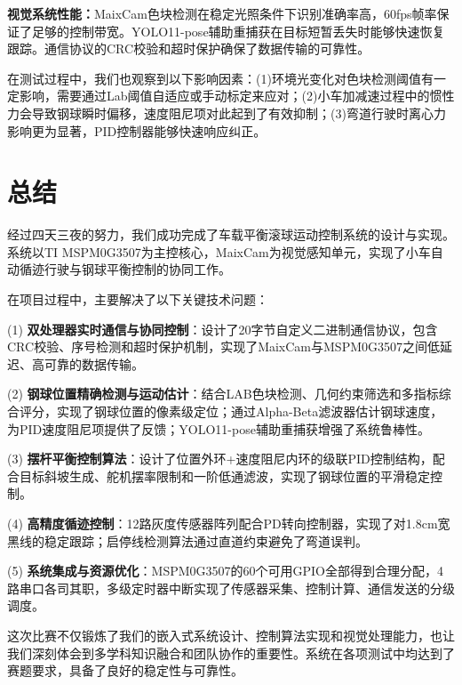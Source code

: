 \documentclass[12pt,a4paper]{ctexart}
\begin{document}
\textbf{视觉系统性能：}MaixCam色块检测在稳定光照条件下识别准确率高，60fps帧率保证了足够的控制带宽。YOLO11-pose辅助重捕获在目标短暂丢失时能够快速恢复跟踪。通信协议的CRC校验和超时保护确保了数据传输的可靠性。

在测试过程中，我们也观察到以下影响因素：(1)环境光变化对色块检测阈值有一定影响，需要通过Lab阈值自适应或手动标定来应对；(2)小车加减速过程中的惯性力会导致钢球瞬时偏移，速度阻尼项对此起到了有效抑制；(3)弯道行驶时离心力影响更为显著，PID控制器能够快速响应纠正。

\section{\textbf{总结}}

经过四天三夜的努力，我们成功完成了车载平衡滚球运动控制系统的设计与实现。系统以TI MSPM0G3507为主控核心，MaixCam为视觉感知单元，实现了小车自动循迹行驶与钢球平衡控制的协同工作。

在项目过程中，主要解决了以下关键技术问题：

(1) \textbf{双处理器实时通信与协同控制}：设计了20字节自定义二进制通信协议，包含CRC校验、序号检测和超时保护机制，实现了MaixCam与MSPM0G3507之间低延迟、高可靠的数据传输。

(2) \textbf{钢球位置精确检测与运动估计}：结合LAB色块检测、几何约束筛选和多指标综合评分，实现了钢球位置的像素级定位；通过Alpha-Beta滤波器估计钢球速度，为PID速度阻尼项提供了反馈；YOLO11-pose辅助重捕获增强了系统鲁棒性。

(3) \textbf{摆杆平衡控制算法}：设计了位置外环+速度阻尼内环的级联PID控制结构，配合目标斜坡生成、舵机摆率限制和一阶低通滤波，实现了钢球位置的平滑稳定控制。

(4) \textbf{高精度循迹控制}：12路灰度传感器阵列配合PD转向控制器，实现了对1.8cm宽黑线的稳定跟踪；启停线检测算法通过直道约束避免了弯道误判。

(5) \textbf{系统集成与资源优化}：MSPM0G3507的60个可用GPIO全部得到合理分配，4路串口各司其职，多级定时器中断实现了传感器采集、控制计算、通信发送的分级调度。

这次比赛不仅锻炼了我们的嵌入式系统设计、控制算法实现和视觉处理能力，也让我们深刻体会到多学科知识融合和团队协作的重要性。系统在各项测试中均达到了赛题要求，具备了良好的稳定性与可靠性。
\end{document}
